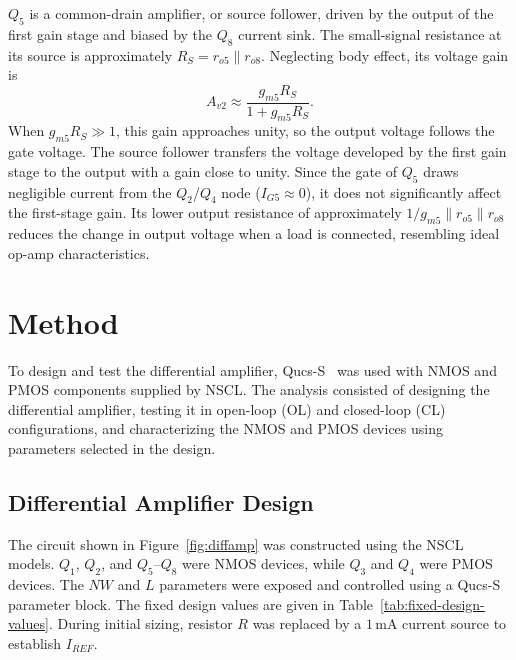 \documentclass[11pt,a4paper]{article}
\begin{document}
$Q_5$ is a common-drain amplifier, or source follower, driven by the output of the first gain stage and biased by the $Q_8$ current sink. The small-signal resistance at its source is approximately $R_S=r_{o5}\parallel r_{o8}$. Neglecting body effect, its voltage gain is
\begin{equation}
    A_{v2}\approx\frac{g_{m5}R_S}{1+g_{m5}R_S}.
    \label{eq:source-follower-gain}
\end{equation}
When $g_{m5}R_S\gg1$, this gain approaches unity, so the output voltage follows the gate voltage. 
The source follower transfers the voltage developed by the first gain stage to the output with a gain close to unity. Since the gate of $Q_5$ draws negligible current from the $Q_2$/$Q_4$ node ($I_{G5}\approx0$), it does not significantly affect the first-stage gain. Its lower output resistance of approximately $1/g_{m5}\parallel r_{o5}\parallel r_{o8}$ reduces the change in output voltage when a load is connected, resembling ideal op-amp characteristics.

\section{Method}

To design and test the differential amplifier, Qucs-S~\cite{qucs} was used with NMOS and PMOS components supplied by NSCL. The analysis consisted of designing the differential amplifier, testing it in open-loop (OL) and closed-loop (CL) configurations, and characterizing the NMOS and PMOS devices using parameters selected in the design.

\subsection{Differential Amplifier Design}

The circuit shown in Figure~\ref{fig:diffamp} was constructed using the NSCL models. $Q_1$, $Q_2$, and $Q_5$--$Q_8$ were NMOS devices, while $Q_3$ and $Q_4$ were PMOS devices. The $NW$ and $L$ parameters were exposed and controlled using a Qucs-S parameter block. The fixed design values are given in Table~\ref{tab:fixed-design-values}. During initial sizing, resistor $R$ was replaced by a \(1\,\mathrm{mA}\) current source to establish $I_{REF}$.
\end{document}
